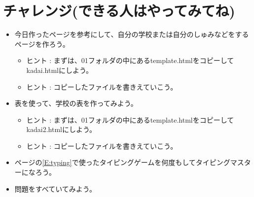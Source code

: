 \documentclass[a4paper,12pt]{jarticle}
\begin{document}
\section{チャレンジ(できる人はやってみてね)}
\begin{itemize}
      \item
            今日作ったページを参考にして、自分の学校または自分のしゅみなどをするページを作ろう。

            \begin{itemize}
                  \item ヒント :
                        まずは、01フォルダの中にあるtemplate.htmlをコピーしてkadai.htmlにしよう。
                  \item ヒント :
                        コピーしたファイルを書きえていこう。
            \end{itemize}
      \item
            表を使って、学校の表を作ってみよう。

            \begin{itemize}
                  \item ヒント :
                        まずは、01フォルダの中にあるtemplate.htmlをコピーしてkadai2.htmlにしよう。
                  \item ヒント :
                        コピーしたファイルを書きえていこう。
            \end{itemize}
      \item
            \pageref*{E:typing}ページの\ref*{E:typing}で使ったタイピングゲームを何度もしてタイピングマスターになろう。
      \item 問題をすべていてみよう。
\end{itemize}

\bigskip


\bigskip


\bigskip

\clearpage
\end{document}
